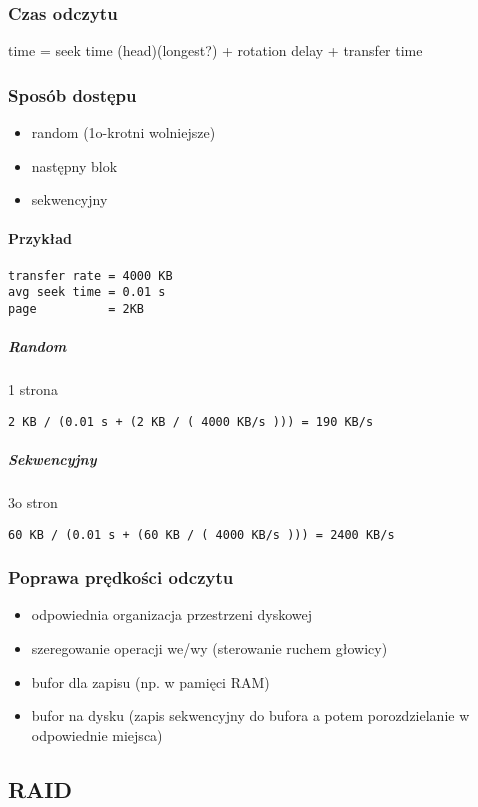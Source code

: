 \documentclass[12pt]{article}
\begin{document}
\subsubsection{Czas odczytu}
time = seek time (head)(longest?) + rotation delay + transfer time

\subsubsection{Sposób dostępu}
\begin{itemize}
\item random (1o-krotni wolniejsze)
\item następny blok
\item sekwencyjny
\end{itemize}

\paragraph{Przykład}
\begin{verbatim}
transfer rate = 4000 KB
avg seek time = 0.01 s
page          = 2KB
\end{verbatim}

\subparagraph{Random}
1 strona
\begin{verbatim}
2 KB / (0.01 s + (2 KB / ( 4000 KB/s ))) = 190 KB/s
\end{verbatim}
\subparagraph{Sekwencyjny}
3o stron
\begin{verbatim}
60 KB / (0.01 s + (60 KB / ( 4000 KB/s ))) = 2400 KB/s
\end{verbatim}

\subsubsection{Poprawa prędkości odczytu}
\begin{itemize}
\item odpowiednia organizacja przestrzeni dyskowej
\item szeregowanie operacji we/wy (sterowanie ruchem głowicy)
\item bufor dla zapisu (np. w pamięci RAM)
\item bufor na dysku (zapis sekwencyjny do bufora a potem porozdzielanie w odpowiednie miejsca)
\end{itemize}

\subsection{\ac{RAID}}
\end{document}

